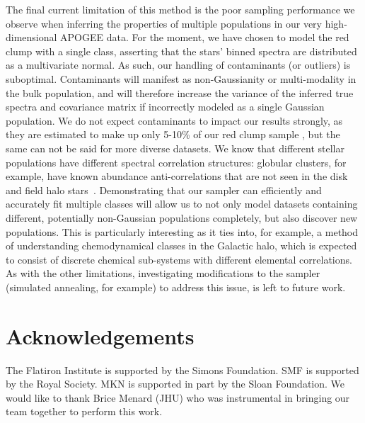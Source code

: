 \documentclass[a4paper,fleqn,usenatbib]{mnras}
\begin{document}
The final current limitation of this method is the poor sampling performance we observe when inferring the properties of multiple populations in our very high-dimensional APOGEE data. For the moment, we have chosen to model the red clump with a single class, asserting that the stars' binned spectra are distributed as a multivariate normal. As such, our handling of contaminants (or outliers) is suboptimal. Contaminants will manifest as non-Gaussianity or multi-modality in the bulk population, and will therefore increase the variance of the inferred true spectra and covariance matrix if incorrectly modeled as a single Gaussian population. We do not expect contaminants to impact our results strongly, as they are estimated to make up only 5-10\% of our red clump sample \citep{Bovy2015}, but the same can not be said for more diverse datasets. We know that different stellar populations have different spectral correlation structures: globular clusters, for example, have known abundance anti-correlations that are not seen in the disk and field halo stars~\citep[e.g.,][]{Kraft1997,Gratton2015, Pan2017,Carr2019}. Demonstrating that our sampler can efficiently and accurately fit multiple classes will allow us to not only model datasets containing different, potentially non-Gaussian populations completely, but also discover new populations. This is particularly interesting as it ties into, for example, a method of understanding chemodynamical classes in the Galactic halo, which is expected to consist of discrete chemical sub-systems with different elemental correlations. As with the other limitations, investigating modifications to the sampler (simulated annealing, for example) to address this issue, is left to future work.



\section*{Acknowledgements}

The Flatiron Institute is supported by the Simons Foundation.
SMF is supported by the Royal Society. MKN is supported in part by the Sloan Foundation. We would like to thank Brice Menard (JHU) who was instrumental in bringing our team together to perform this work. 







\bsp	%
\label{lastpage}
\end{document}
